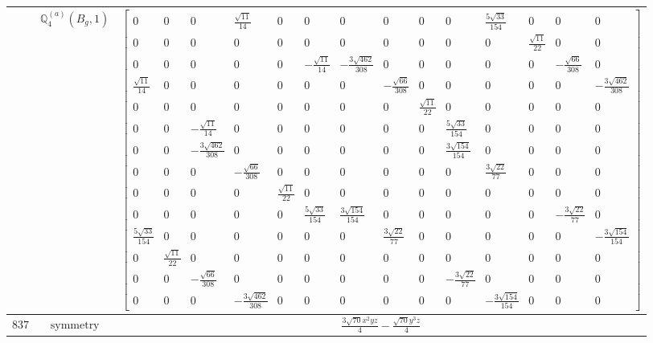 \documentclass[fleqn,8pt,landscape]{jsarticle}
\begin{document}
\begin{longtable}{ccc}
$  $ & $ \mathbb{Q}_{4}^{(a)}(B_{g},1) $ & $ \begin{bmatrix} 0 & 0 & 0 & \frac{\sqrt{11}}{14} & 0 & 0 & 0 & 0 & 0 & 0 & \frac{5 \sqrt{33}}{154} & 0 & 0 & 0 \\ 0 & 0 & 0 & 0 & 0 & 0 & 0 & 0 & 0 & 0 & 0 & \frac{\sqrt{11}}{22} & 0 & 0 \\ 0 & 0 & 0 & 0 & 0 & - \frac{\sqrt{11}}{14} & - \frac{3 \sqrt{462}}{308} & 0 & 0 & 0 & 0 & 0 & - \frac{\sqrt{66}}{308} & 0 \\ \frac{\sqrt{11}}{14} & 0 & 0 & 0 & 0 & 0 & 0 & - \frac{\sqrt{66}}{308} & 0 & 0 & 0 & 0 & 0 & - \frac{3 \sqrt{462}}{308} \\ 0 & 0 & 0 & 0 & 0 & 0 & 0 & 0 & \frac{\sqrt{11}}{22} & 0 & 0 & 0 & 0 & 0 \\ 0 & 0 & - \frac{\sqrt{11}}{14} & 0 & 0 & 0 & 0 & 0 & 0 & \frac{5 \sqrt{33}}{154} & 0 & 0 & 0 & 0 \\ 0 & 0 & - \frac{3 \sqrt{462}}{308} & 0 & 0 & 0 & 0 & 0 & 0 & \frac{3 \sqrt{154}}{154} & 0 & 0 & 0 & 0 \\ 0 & 0 & 0 & - \frac{\sqrt{66}}{308} & 0 & 0 & 0 & 0 & 0 & 0 & \frac{3 \sqrt{22}}{77} & 0 & 0 & 0 \\ 0 & 0 & 0 & 0 & \frac{\sqrt{11}}{22} & 0 & 0 & 0 & 0 & 0 & 0 & 0 & 0 & 0 \\ 0 & 0 & 0 & 0 & 0 & \frac{5 \sqrt{33}}{154} & \frac{3 \sqrt{154}}{154} & 0 & 0 & 0 & 0 & 0 & - \frac{3 \sqrt{22}}{77} & 0 \\ \frac{5 \sqrt{33}}{154} & 0 & 0 & 0 & 0 & 0 & 0 & \frac{3 \sqrt{22}}{77} & 0 & 0 & 0 & 0 & 0 & - \frac{3 \sqrt{154}}{154} \\ 0 & \frac{\sqrt{11}}{22} & 0 & 0 & 0 & 0 & 0 & 0 & 0 & 0 & 0 & 0 & 0 & 0 \\ 0 & 0 & - \frac{\sqrt{66}}{308} & 0 & 0 & 0 & 0 & 0 & 0 & - \frac{3 \sqrt{22}}{77} & 0 & 0 & 0 & 0 \\ 0 & 0 & 0 & - \frac{3 \sqrt{462}}{308} & 0 & 0 & 0 & 0 & 0 & 0 & - \frac{3 \sqrt{154}}{154} & 0 & 0 & 0 \end{bmatrix} $ \\ \hline
$ 837 $ & $ \text{symmetry} $ & $ \frac{3 \sqrt{70} x^{2} y z}{4} - \frac{\sqrt{70} y^{3} z}{4} $ \\

\end{longtable}
\end{document}
